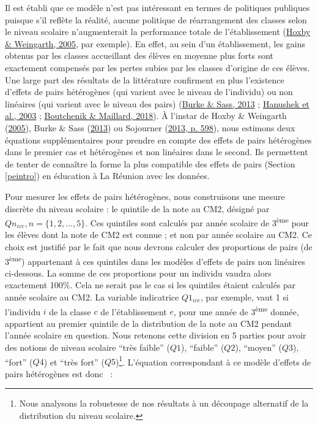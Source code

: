 \documentclass[
]{book}
\begin{document}
\quad Il est établi que ce modèle n'est pas intéressant en termes de politiques publiques puisque s'il reflète la réalité, aucune politique de réarrangement des classes selon le niveau scolaire n'augmenterait la performance totale de l'établissement (\protect\hyperlink{ref-HOX:WEI:05}{Hoxby \& Weingarth, 2005}, par exemple). En effet, au sein d'un établissement, les gains obtenus par les classes accueillant des élèves en moyenne plus forts sont exactement compensés par les pertes subies par les classes d'origine de ces élèves. Une large part des résultats de la littérature confirment en plus l'existence d'effets de pairs hétérogènes (qui varient avec le niveau de l'individu) ou non linéaires (qui varient avec le niveau des pairs) (\protect\hyperlink{ref-BUR:SAS:13}{Burke \& Sass, 2013} ; \protect\hyperlink{ref-HAN:eal:03}{Hanushek et al., 2003} ; \protect\hyperlink{ref-BOU:MAI:18}{Boutchenik \& Maillard, 2018}). À l'instar de Hoxby \& Weingarth (\protect\hyperlink{ref-HOX:WEI:05}{2005}), Burke \& Sass (\protect\hyperlink{ref-BUR:SAS:13}{2013}) ou Sojourner (\protect\hyperlink{ref-SOJ:13}{2013, p. 598}), nous estimons deux équations supplémentaires pour prendre en compte des effets de pairs hétérogènes dans le premier cas et hétérogènes et non linéaires dans le second. Ils permettent de tenter de connaître la forme la plus compatible des effets de pairs (Section \ref{peintro}) en éducation à La Réunion avec les données.

\quad Pour mesurer les effets de pairs hétérogènes, nous construisons une mesure discrète du niveau scolaire : le quintile de la note au CM2, désigné par \(Qn_{ice}, n = \{1, 2, ..., 5\}\). Ces quintiles sont calculés par année scolaire de 3\textsuperscript{ème} pour les élèves dont la note de CM2 est connue ; et non par année scolaire au CM2. Ce choix est justifié par le fait que nous devrons calculer des proportions de pairs (de 3\textsuperscript{ème}) appartenant à ces quintiles dans les modèles d'effets de pairs non linéaires ci-dessous. La somme de ces proportions pour un individu vaudra alors exactement 100\%. Cela ne serait pas le cas si les quintiles étaient calculés par année scolaire au CM2. La variable indicatrice \(Q1_{ice}\), par exemple, vaut 1 si l'individu \(i\) de la classe \(c\) de l'établissement \(e\), pour une année de 3\textsuperscript{ème} donnée, appartient au premier quintile de la distribution de la note au CM2 pendant l'année scolaire en question. Nous retenons cette division en 5 parties pour avoir des notions de niveau scolaire ``très faible'' (\(Q1\)), ``faible'' (\(Q2\)), ``moyen'' (\(Q3\)), ``fort'' (\(Q4\)) et ``très fort'' (\(Q5\))\footnote{Nous analysons la robustesse de nos résultats à un découpage alternatif de la distribution du niveau scolaire.}. L'équation correspondant à ce modèle d'effets de pairs hétérogènes est donc ~:
\end{document}

